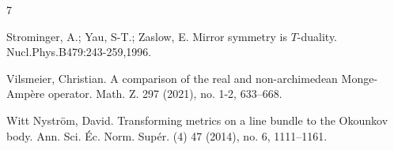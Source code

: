 \documentclass[a4paper]{article}
\theoremstyle{definition}
\begin{document}
\begin{thebibliography}{7}
			
			
			
			
			
			Strominger, A.; Yau, S-T.; Zaslow, E. Mirror symmetry is $T$-duality.
			Nucl.Phys.B479:243-259,1996.
			
			
			

			Vilsmeier, Christian. A comparison of the real and non-archimedean Monge-Ampère operator. Math. Z. 297 (2021), no. 1-2, 633--668. 
			
			
			
			Witt Nyström, David. Transforming metrics on a line bundle to the Okounkov body. Ann. Sci. Éc. Norm. Supér. (4) 47 (2014), no. 6, 1111--1161.
			
			
			
			
			
			
		
			
		
		
	\end{thebibliography}
	
\end{document}
